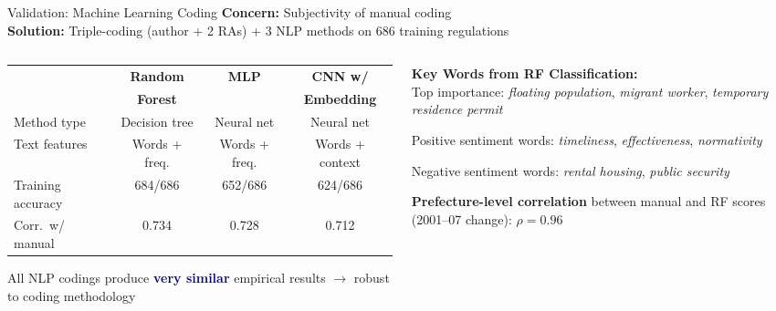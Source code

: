 \documentclass[10pt,aspectratio=169,t]{beamer}
\newcommand{\hlight}[1]{\textcolor{darkblue}{\textbf{#1}}}
\newcommand{\rmark}[1]{\textcolor{alertred}{#1}}
\begin{document}
\begin{frame}{Validation: Machine Learning Coding}
\textbf{Concern:} Subjectivity of manual coding\\[4pt]
\textbf{Solution:} Triple-coding (author + 2 RAs) + 3 NLP methods on 686 training regulations

\bigskip
\begin{columns}[T]
\begin{column}{0.55\textwidth}
\begin{table}[h]
\centering\footnotesize
\begin{tabular}{@{}lccc@{}}
\toprule
& \textbf{Random} & \textbf{MLP} & \textbf{CNN w/} \\
& \textbf{Forest} & & \textbf{Embedding} \\
\midrule
Method type & Decision tree & Neural net & Neural net \\
Text features & Words + freq. & Words + freq. & Words + context \\
Training accuracy & 684/686 & 652/686 & 624/686 \\
Corr.\ w/ manual & 0.734 & 0.728 & 0.712 \\
\bottomrule
\end{tabular}
\end{table}

\medskip
All NLP codings produce \hlight{very similar} empirical results $\rightarrow$ robust to coding methodology

\end{column}
\begin{column}{0.42\textwidth}
\textbf{Key Words from RF Classification:}\\[4pt]
Top importance: \textit{floating population}, \textit{migrant worker}, \textit{temporary residence permit}

\medskip
Positive sentiment words: \textit{timeliness}, \textit{effectiveness}, \textit{normativity}

\medskip
Negative sentiment words: \textit{rental housing}, \textit{public security}

\bigskip
\textbf{Prefecture-level correlation} between manual and RF scores (2001--07 change): \rmark{$\rho = 0.96$}
\end{column}
\end{columns}
\end{frame}
\end{document}
